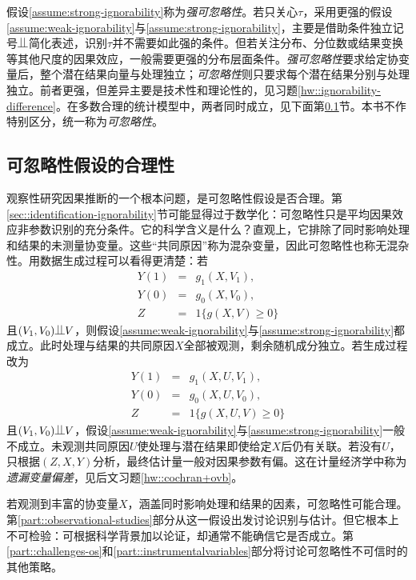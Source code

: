假设\ref{assume:strong-ignorability}称为{\it 强可忽略性}\citep{rubin1978bayesian, rosenbaum1983central}。若只关心$\tau$，采用更强的假设\ref{assume:weak-ignorability}与\ref{assume:strong-ignorability}，主要是借助条件独立记号$\ind$简化表述，识别$\tau$并不需要如此强的条件。但若关注分布、分位数或结果变换等其他尺度的因果效应，一般需要更强的分布层面条件。{\it 强可忽略性}要求给定协变量后，整个潜在结果向量与处理独立；{\it 可忽略性}则只要求每个潜在结果分别与处理独立。前者更强，但差异主要是技术性和理论性的，见习题\ref{hw::ignorability-difference}。在多数合理的统计模型中，两者同时成立，见下面第\ref{sec::plausibility-ignorability}节。本书不作特别区分，统一称为{\it 可忽略性}。 
 
 
 
 
 
 \subsection{可忽略性假设的合理性} \label{sec::plausibility-ignorability}



观察性研究因果推断的一个根本问题，是可忽略性假设是否合理。第\ref{sec::identification-ignorability}节可能显得过于数学化：可忽略性只是平均因果效应非参数识别的充分条件。它的科学含义是什么？直观上，它排除了同时影响处理和结果的未测量协变量。这些“共同原因”称为混杂变量，因此可忽略性也称无混杂性。用数据生成过程可以看得更清楚：若
\begin{eqnarray*}
Y(1) &=& g_1(X, V_1),\\
Y(0) &=& g_0(X, V_0), \\
Z &=& 1\{ g(X,V)  \geq 0 \}
\end{eqnarray*}
且$(V_1, V_0)\ind V$，则假设\ref{assume:weak-ignorability}与\ref{assume:strong-ignorability}都成立。此时处理与结果的共同原因$X$全部被观测，剩余随机成分独立。若生成过程改为
\begin{eqnarray*}
Y(1) &=& g_1(X, U, V_1),\\
Y(0) &=& g_0(X, U, V_0), \\
Z &=& 1\{ g(X, U, V)  \geq 0 \}
\end{eqnarray*}
且$(V_1, V_0)\ind V$，假设\ref{assume:weak-ignorability}与\ref{assume:strong-ignorability}一般不成立。未观测共同原因$U$使处理与潜在结果即使给定$X$后仍有关联。若没有$U$，只根据$(Z,X,Y)$分析，最终估计量一般对因果参数有偏。这在计量经济学中称为{\it 遗漏变量偏差}，见后文习题\ref{hw::cochran+ovb}。 



若观测到丰富的协变量$X$，涵盖同时影响处理和结果的因素，可忽略性可能合理。第\ref{part::observational-studies}部分从这一假设出发讨论识别与估计。但它根本上不可检验：可根据科学背景加以论证，却通常不能确信它是否成立。第\ref{part::challenges-os}和\ref{part::instrumentalvariables}部分将讨论可忽略性不可信时的其他策略。 




